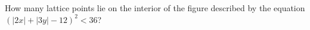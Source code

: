 How many lattice points lie on the interior of the figure described by the equation $(|2x| + |3y| - 12)^2 < 36$?

